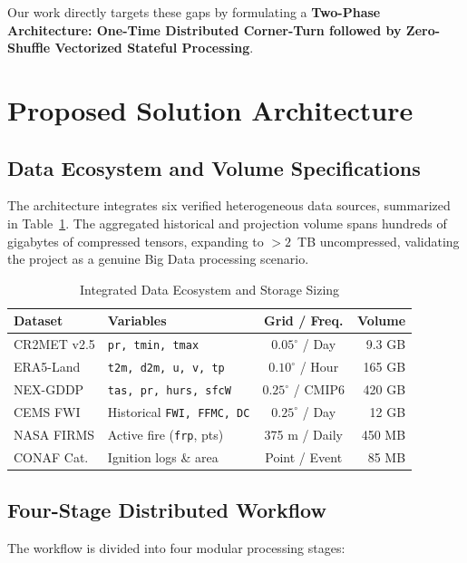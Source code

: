 \documentclass[10pt,conference]{IEEEtran}
\begin{document}
Our work directly targets these gaps by formulating a \textbf{Two-Phase Architecture: One-Time Distributed Corner-Turn followed by Zero-Shuffle Vectorized Stateful Processing}.

\section{Proposed Solution Architecture}

\subsection{Data Ecosystem and Volume Specifications}
The architecture integrates six verified heterogeneous data sources, summarized in Table~\ref{tab:datasources}. The aggregated historical and projection volume spans hundreds of gigabytes of compressed tensors, expanding to $>2$~TB uncompressed, validating the project as a genuine Big Data processing scenario.

\begin{table}[t]
\centering
\caption{Integrated Data Ecosystem and Storage Sizing}
\label{tab:datasources}
\footnotesize
\begin{tabularx}{\columnwidth}{l X c r}
\toprule
\textbf{Dataset} & \textbf{Variables} & \textbf{Grid / Freq.} & \textbf{Volume} \\
\midrule
CR2MET v2.5 & \texttt{pr, tmin, tmax} & $0.05^\circ$ / Day & 9.3 GB \\
ERA5-Land & \texttt{t2m, d2m, u, v, tp} & $0.10^\circ$ / Hour & 165 GB \\
NEX-GDDP & \texttt{tas, pr, hurs, sfcW} & $0.25^\circ$ / CMIP6 & 420 GB \\
CEMS FWI & Historical \texttt{FWI, FFMC, DC} & $0.25^\circ$ / Day & 12 GB \\
NASA FIRMS & Active fire (\texttt{frp}, pts) & 375 m / Daily & 450 MB \\
CONAF Cat. & Ignition logs \& area & Point / Event & 85 MB \\
\bottomrule
\end{tabularx}
\end{table}

\subsection{Four-Stage Distributed Workflow}
The workflow is divided into four modular processing stages:
\end{document}
